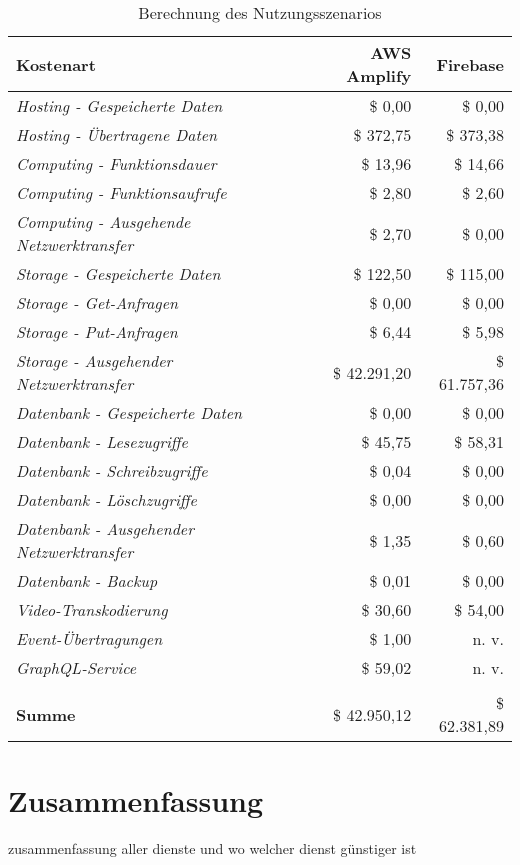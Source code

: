 \begin{table}[h]
  \caption{Berechnung des Nutzungsszenarios}
  \label{BerechnungNutzungsszenario}
  \renewcommand{\arraystretch}{1.2}
  \centering
  \sffamily
  \begin{footnotesize}
    \begin{tabularx}{0.9\textwidth}{l r r}
      \toprule
      \textbf{Kostenart} & \textbf{AWS Amplify} & \textbf{Firebase}\\
      \midrule
      \emph{Hosting - Gespeicherte Daten} & \$ 0,00  & \$ 0,00 \\
      \emph{Hosting - Übertragene Daten} & \$ 372,75 & \$ 373,38 \\
      \emph{Computing - Funktionsdauer} & \$ 13,96 & \$ 14,66 \\
      \emph{Computing - Funktionsaufrufe} & \$ 2,80 & \$ 2,60 \\
      \emph{Computing - Ausgehende Netzwerktransfer} & \$ 2,70 & \$ 0,00 \\
      \emph{Storage - Gespeicherte Daten} & \$ 122,50 & \$ 115,00 \\
      \emph{Storage - Get-Anfragen} & \$ 0,00 & \$ 0,00 \\
      \emph{Storage - Put-Anfragen} & \$ 6,44 & \$ 5,98 \\
      \emph{Storage - Ausgehender Netzwerktransfer} & \$ 42.291,20 & \$ 61.757,36 \\
      \emph{Datenbank - Gespeicherte Daten} & \$ 0,00 & \$ 0,00 \\
      \emph{Datenbank - Lesezugriffe} & \$ 45,75 & \$ 58,31 \\
      \emph{Datenbank - Schreibzugriffe} & \$ 0,04 & \$ 0,00 \\
      \emph{Datenbank - Löschzugriffe} & \$ 0,00 & \$ 0,00 \\
      \emph{Datenbank - Ausgehender Netzwerktransfer} & \$ 1,35 & \$ 0,60 \\
      \emph{Datenbank - Backup} & \$ 0,01 & \$ 0,00 \\
      \emph{Video-Transkodierung} & \$ 30,60 & \$ 54,00 \\
      \emph{Event-Übertragungen} & \$ 1,00 & n. v. \\
      \emph{GraphQL-Service} & \$ 59,02 & n. v. \\
      \emph{} &  &  \\
      \textbf{Summe} & \$ 42.950,12 & \$ 62.381,89 \\
      \bottomrule
    \end{tabularx}
  \end{footnotesize}
  \rmfamily
\end{table}

\section{Zusammenfassung}

zusammenfassung aller dienste und wo welcher dienst günstiger ist